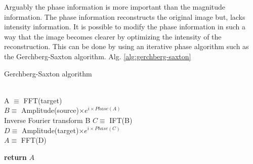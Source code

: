 \documentclass{article}
\begin{document}
Arguably the phase information is more important than the magnitude information. The phase information reconstructs the original image but, lacks intensity information.
It is possible to modify the phase information in such a way that the image becomes clearer by optimizing the intensity of the reconstruction. This can be done by using an iterative phase algorithm such as the Gerchberg-Saxton algorithm. Alg. \ref{alg:gerchberg-saxton}


\begin{algorithm}[H]
\caption{Gerchberg-Saxton algorithm}\label{alg:gerchberg-saxton}
\begin{algorithmic}[1]
\\
\State A $\equiv$ FFT(target)\\
\State $B\equiv$ Amplitude(source)$\times e^{i\times Phase(A)}$ \\
\Comment Inverse Fourier transform B
\State $C\equiv$ IFT(B) \\
\State $D\equiv$ Amplitude(target)$\times e^{i \times Phase(C)}$ \\
\State $A\equiv$ FFT(D)

\State \textbf{return} $A$ \\
\EndProcedure

\end{algorithmic}

\end{algorithm}
\end{document}
